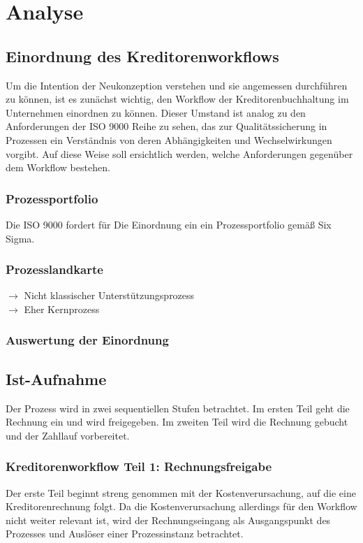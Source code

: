 \chapter{Analyse}

\section{Einordnung des Kreditorenworkflows}
Um die Intention der Neukonzeption verstehen und sie angemessen durchführen zu können, ist es zunächst wichtig, den Workflow der Kreditorenbuchhaltung im Unternehmen einordnen zu können. 
Dieser Umstand ist analog zu den Anforderungen der ISO 9000 Reihe zu sehen, das zur Qualitätssicherung in Prozessen ein Verständnis von deren Abhängigkeiten und Wechselwirkungen vorgibt. 
Auf diese Weise soll ersichtlich werden, welche Anforderungen gegenüber dem Workflow bestehen.

\subsection{Prozessportfolio}
Die ISO 9000 fordert für
Die Einordnung ein ein Prozessportfolio gemäß Six Sigma.



\subsection{Prozesslandkarte}
$\rightarrow$ Nicht klassischer Unterstützungsprozess\\
$\rightarrow$ Eher Kernprozess



\subsection{Auswertung der Einordnung}





\section{Ist-Aufnahme}
Der Prozess wird in zwei sequentiellen Stufen betrachtet. 
Im ersten Teil geht die Rechnung  ein und wird freigegeben.
Im zweiten Teil wird die Rechnung gebucht und der Zahllauf vorbereitet.
\subsection{Kreditorenworkflow Teil 1: Rechnungsfreigabe}
Der erste Teil beginnt streng genommen mit der Kostenverursachung, auf die eine Kreditorenrechnung folgt. 
Da die Kostenverursachung allerdings für den Workflow nicht weiter relevant ist, wird der Rechnungseingang als Ausgangspunkt des Prozesses und Auslöser einer Prozessinstanz betrachtet. 
